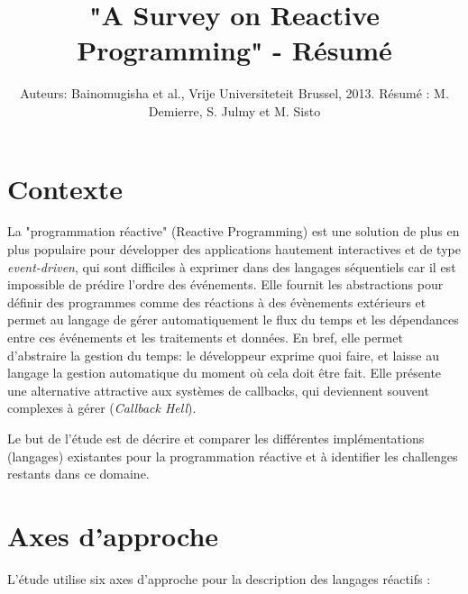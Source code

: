 \documentclass[10pt,final]{IEEEtran}
\begin{document}

\title{"A Survey on Reactive Programming" - Résumé}

\author{Auteurs: Bainomugisha et al., Vrije Universiteteit Brussel, 2013. Résumé : M. Demierre, S. Julmy et M. Sisto\vspace{-4.5ex}}

\maketitle

\section{Contexte}

La "programmation réactive" (Reactive Programming) est une solution de plus en plus populaire pour développer des applications hautement interactives et de type \textit{event-driven}, qui sont difficiles à exprimer dans des langages séquentiels car il est impossible de prédire l'ordre des événements. Elle fournit les abstractions pour définir des programmes comme des réactions à des évènements extérieurs et permet au langage de gérer automatiquement le flux du temps et les dépendances entre ces événements et les traitements et données. En bref, elle permet d'abstraire la gestion du temps: le développeur exprime quoi faire, et laisse au langage la gestion automatique du moment où cela doit être fait. Elle présente une alternative attractive aux systèmes de callbacks, qui deviennent souvent complexes à gérer (\textit{Callback Hell}).

Le but de l'étude est de décrire et comparer les différentes implémentations (langages) existantes pour la programmation réactive et à identifier les challenges restants dans ce domaine.

\section{Axes d'approche}
L'étude utilise six axes d'approche pour la description des langages réactifs :
\end{document}
